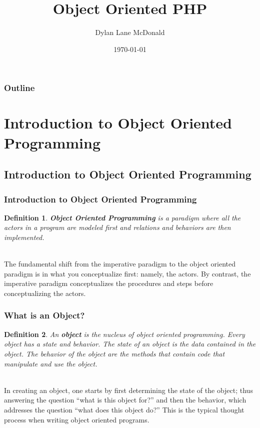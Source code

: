 \documentclass[aspectratio=169]{beamer}
\title{Object Oriented PHP}
\author{Dylan Lane McDonald}
\institute{CNM STEMulus Center\\Web Development with PHP}
\date{\today}
\newtheorem{defn}{Definition}
\begin{document}
\lstset{language=Java}
\begin{frame}
\titlepage
\end{frame}

\begin{frame}
\frametitle{Outline}
\tableofcontents
\end{frame}

\section{Introduction to Object Oriented Programming}
\subsection{Introduction to Object Oriented Programming}
\begin{frame}
\frametitle{Introduction to Object Oriented Programming}
\begin{defn}
\textbf{Object Oriented Programming} is a paradigm where all the actors in a program are modeled first and relations and behaviors are then implemented.
\end{defn}

\pause
\mbox{}\\
The fundamental shift from the imperative paradigm to the object oriented paradigm is in what you conceptualize first: namely, the actors. By contrast, the imperative paradigm conceptualizes the procedures and steps before conceptualizing the actors.
\end{frame}

\begin{frame}
\frametitle{What is an Object?}
\begin{defn}
An \textbf{object} is the nucleus of object oriented programming. Every object has a \emph{state} and \emph{behavior}. The state of an object is the data contained in the object. The behavior of the object are the \emph{methods} that contain code that manipulate and use the object.
\end{defn}

\pause
\mbox{}\\
In creating an object, one starts by first determining the state of the object; thus answering the question ``what is this object for?'' and then the behavior, which addresses the question ``what does this object do?'' This is the typical thought process when writing object oriented programs.
\end{frame}
\end{document}
